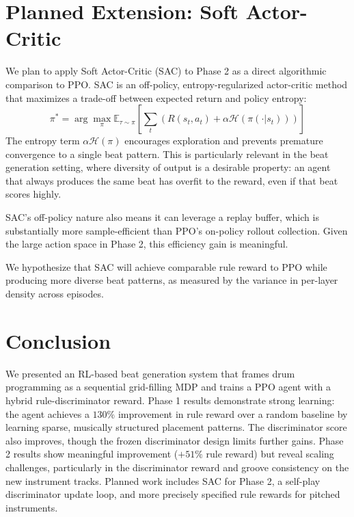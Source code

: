 \documentclass[11pt]{article}
\begin{document}
\section{Planned Extension: Soft Actor-Critic}

We plan to apply Soft Actor-Critic (SAC) to Phase 2 as a direct algorithmic comparison to PPO. SAC is an off-policy, entropy-regularized actor-critic method that maximizes a trade-off between expected return and policy entropy:
\[
\pi^* = \arg\max_\pi \mathbb{E}_{\tau \sim \pi} \left[ \sum_t \left( R(s_t, a_t) + \alpha \mathcal{H}(\pi(\cdot | s_t)) \right) \right]
\]
The entropy term $\alpha \mathcal{H}(\pi)$ encourages exploration and prevents premature convergence to a single beat pattern. This is particularly relevant in the beat generation setting, where diversity of output is a desirable property: an agent that always produces the same beat has overfit to the reward, even if that beat scores highly.

SAC's off-policy nature also means it can leverage a replay buffer, which is substantially more sample-efficient than PPO's on-policy rollout collection. Given the large action space in Phase 2, this efficiency gain is meaningful.

We hypothesize that SAC will achieve comparable rule reward to PPO while producing more diverse beat patterns, as measured by the variance in per-layer density across episodes.

\section{Conclusion}

We presented an RL-based beat generation system that frames drum programming as a sequential grid-filling MDP and trains a PPO agent with a hybrid rule-discriminator reward. Phase 1 results demonstrate strong learning: the agent achieves a $130\%$ improvement in rule reward over a random baseline by learning sparse, musically structured placement patterns. The discriminator score also improves, though the frozen discriminator design limits further gains. Phase 2 results show meaningful improvement ($+51\%$ rule reward) but reveal scaling challenges, particularly in the discriminator reward and groove consistency on the new instrument tracks. Planned work includes SAC for Phase 2, a self-play discriminator update loop, and more precisely specified rule rewards for pitched instruments.
\end{document}

